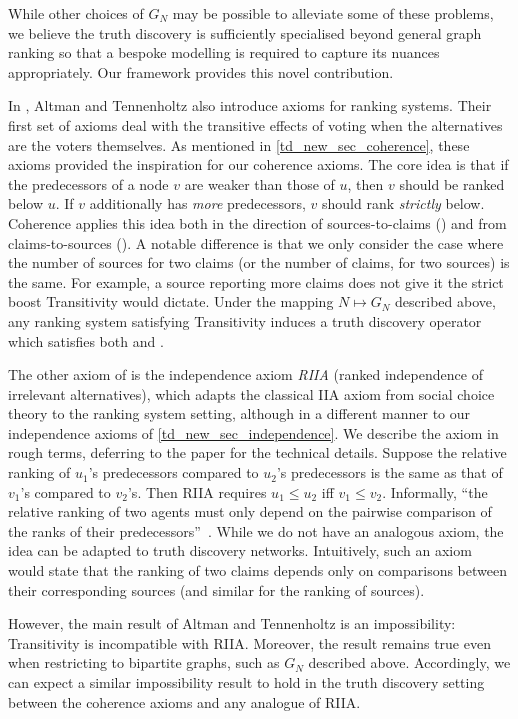 While other choices of $G_N$ may be possible to alleviate some of these
problems, we believe the truth discovery is sufficiently specialised beyond
general graph ranking so that a bespoke modelling is required to capture its
nuances appropriately. Our framework provides this novel contribution.

In \cite{altman2008}, Altman and Tennenholtz also introduce axioms for ranking
systems. Their first set of axioms deal with the transitive effects of voting
when the alternatives are the voters themselves. As mentioned in
\cref{td_new_sec_coherence}, these axioms provided the inspiration for our
coherence axioms. The core idea is that if the predecessors of a node $v$ are
weaker than those of $u$, then $v$ should be ranked below $u$. If $v$
additionally has \emph{more} predecessors, $v$ should rank \emph{strictly}
below. Coherence applies this idea both in the direction of sources-to-claims
(\claimcoherence{}) and from claims-to-sources (\sourcecoherence{}). A notable
difference is that we only consider the case where the number of sources for
two claims (or the number of claims, for two sources) is the same. For example,
a source reporting more claims does not give it the strict boost Transitivity
would dictate. Under the mapping $N \mapsto G_N$ described above, any ranking
system satisfying Transitivity induces a truth discovery operator which
satisfies both \sourcecoherence{} and \claimcoherence{}.

The other axiom of \textcite{altman2008} is the independence axiom \emph{RIIA}
(ranked independence of irrelevant alternatives), which adapts the classical
IIA axiom from social choice theory to the ranking system setting, although in
a different manner to our independence axioms of \cref{td_new_sec_independence}. We
describe the axiom in rough terms, deferring to the paper for the technical
details. Suppose the relative ranking of $u_1$'s predecessors compared to
$u_2$'s predecessors is the same as that of $v_1$'s compared to $v_2$'s. Then
RIIA requires $u_1 \le u_2$ iff $v_1 \le v_2$. Informally, ``the relative
ranking of two agents must only depend on the pairwise comparison of the ranks
of their predecessors''~\cite{altman2008}.
%
While we do not have an analogous axiom, the idea can be adapted to truth
discovery networks. Intuitively, such an axiom would state that the ranking of
two claims depends only on comparisons between their corresponding sources (and
similar for the ranking of sources).

However, the main result of Altman and Tennenholtz is an impossibility:
Transitivity is incompatible with RIIA. Moreover, the result remains true even
when restricting to bipartite graphs, such as $G_N$ described above.
Accordingly, we can expect a similar impossibility result to hold in the truth
discovery setting between the coherence axioms and any analogue of RIIA.

